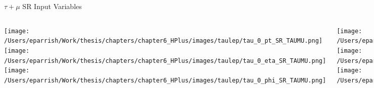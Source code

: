 \documentclass[aspectratio=169,xcolor=table]{beamer}
\begin{document}
    \begin{frame}[t]{$\tau+\mu$ SR Input Variables}
      \begin{columns}[t]
          \texttt{[image: /Users/eparrish/Work/thesis/chapters/chapter6\_HPlus/images/taulep/tau\_0\_pt\_SR\_TAUMU.png]}
          \texttt{[image: /Users/eparrish/Work/thesis/chapters/chapter6\_HPlus/images/taulep/tau\_0\_eta\_SR\_TAUMU.png]}
          \texttt{[image: /Users/eparrish/Work/thesis/chapters/chapter6\_HPlus/images/taulep/tau\_0\_phi\_SR\_TAUMU.png]}

          \texttt{[image: /Users/eparrish/Work/thesis/chapters/chapter6\_HPlus/images/taulep/met\_et\_SR\_TAUMU.png]}
          \texttt{[image: /Users/eparrish/Work/thesis/chapters/chapter6\_HPlus/images/taulep/met\_phi\_SR\_TAUMU.png]}
          \texttt{[image: /Users/eparrish/Work/thesis/chapters/chapter6\_HPlus/images/taulep/jet\_1\_pt\_SR\_TAUMU.png]}

          \texttt{[image: /Users/eparrish/Work/thesis/chapters/chapter6\_HPlus/images/taulep/bjet\_0\_pt\_SR\_TAUMU.png]}
          \texttt{[image: /Users/eparrish/Work/thesis/chapters/chapter6\_HPlus/images/taulep/bjet\_0\_eta\_SR\_TAUMU.png]}
          \texttt{[image: /Users/eparrish/Work/thesis/chapters/chapter6\_HPlus/images/taulep/bjet\_0\_phi\_SR\_TAUMU.png]}

          \texttt{[image: /Users/eparrish/Work/thesis/chapters/chapter6\_HPlus/images/taulep/tau\_0\_upsilon\_SR\_TAUMU.png]}
          \texttt{[image: /Users/eparrish/Work/thesis/chapters/chapter6\_HPlus/images/taulep/tau\_0\_charged\_tracks\_0\_pt\_SR\_TAUMU.png]}

      \end{columns}
    \end{frame}
\end{document}

